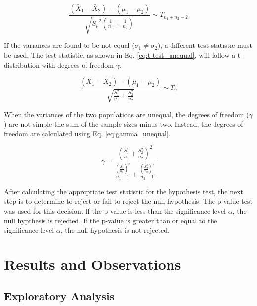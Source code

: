 \documentclass{article}
\begin{document}
\begin{equation}
	\frac{(\bar{X}_1 - \bar{X}_2) - (\mu_1 - \mu_2)}{\sqrt{{S_p}^2
	\left(\frac{1}{n_1} + \frac{1}{n_2} \right)}} \sim T_{n_1 + n_2 -2}
	\label{eq:t-test_equal}
\end{equation}

If the variances are found to be not equal ($\sigma_1 \neq \sigma_2$), a different test statistic must be used. The test statistic, as shown in Eq. \ref{eq:t-test_unequal}, will follow a t-distribution with degrees of freedom $\gamma$. 

\begin{equation}
	\frac{(\bar{X}_1 - \bar{X}_2) - (\mu_1 - \mu_2)}{\sqrt{\frac{S_1^2}{n_1} +
	\frac{S_2^2}{n_2}}} \sim T_\gamma
	\label{eq:t-test_unequal}
\end{equation}

When the variances of the two populations are unequal, the degrees of freedom ($\gamma$) are not simple the sum of the sample sizes minus two. Instead, the degrees of freedom are calculated using Eq. \ref{eq:gamma_unequal}.

\begin{equation}
	\gamma = \frac{\left(\frac{S_1^2}{n_1} + \frac{S_2^2}{n_2}
	\right)^2}{\frac{\left(\frac{S_1^2}{n_1} \right)^2}{n_1 - 1} +
	\frac{\left(\frac{S_2^2}{n_2} \right)^2}{n_2 - 1}}
	\label{eq:gamma_unequal}
\end{equation}

After calculating the appropriate test statistic for the hypothesis test, the next step is to determine to reject or fail to reject the null hypothesis. The p-value test was used for this decision. If the p-value is less than the significance level $\alpha$, the null hypthesis is rejected. If the p-value is greater than or equal to the significance level $\alpha$, the null hypothesis is not rejected.

\section{Results and Observations}
\subsection{Exploratory Analysis}
\end{document}
